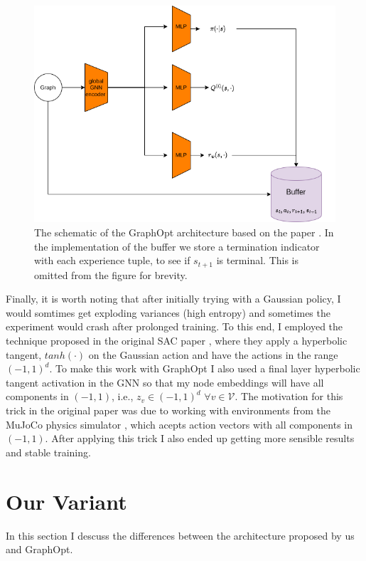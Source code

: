 \documentclass{report}
\numberwithin{equation}{section}
\numberwithin{figure}{section}
\numberwithin{table}{section}
\numberwithin{algorithm}{section}
\begin{document}
\begin{figure}[H]
  \begin{center}
    \includegraphics[scale=0.5]{GO_architecture.png}
    \caption{\label{fig:GraphOpt} The schematic of the GraphOpt 
    architecture based on the paper \cite{GraphOpt}. 
    In the implementation of the buffer 
    we store a termination indicator with 
    each experience tuple, to see if $s_{t+1}$ is terminal. 
    This is omitted from the figure for brevity.}
  \end{center}
\end{figure}


Finally, it is worth noting that after initially trying with a 
Gaussian policy, I would somtimes get exploding variances (high 
entropy) and sometimes the experiment would crash after prolonged 
training. To this end, I employed the technique proposed 
in the original SAC paper \citep{SAC2}, where they apply a 
hyperbolic tangent, $tanh(\cdot)$ on the Gaussian action and 
have the actions in the range $(-1, 1)^{d}$. To make this work 
with GraphOpt I also used a final layer hyperbolic tangent 
activation in the GNN so that my node embeddings will have 
all components in $(-1, 1)$, i.e., $z_v\in (-1, 1)^{d}$ 
$\forall v\in\mathcal{V}$. The motivation for this trick in the 
original paper was due to working with environments 
from the MuJoCo physics simulator 
\citep{MuJoCo}, which acepts action vectors with all components 
in $(-1, 1)$. After applying this trick I also ended up getting 
more sensible results and stable training.

\section{Our Variant}
In this section I descuss the differences between the architecture 
proposed by us and GraphOpt.
\end{document}
